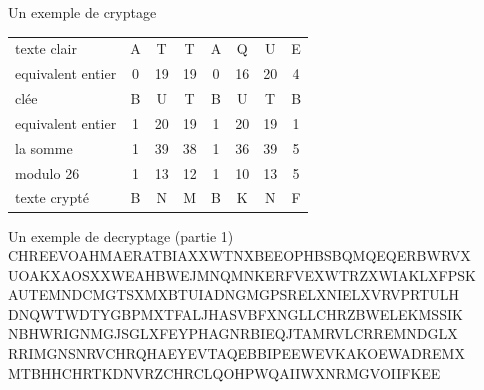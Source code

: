 \documentclass[10pt,xcolor=table]{beamer}
\begin{document}
\begin{frame}
\begin{exampleblock}{Un exemple de cryptage} %
\begin{tabular}{l!{\vrule}ccccccc} 
texte clair & A & T & T & A & Q & U & E \pause \\  
equivalent entier & 0 & 19 & 19 & 0 & 16 & 20 & 4 \pause \\ 
clée & B & U & T & B & U & T & B \pause  \\ 
equivalent entier & 1 & 20 & 19 & 1 & 20 & 19 & 1\pause \\ \hline
la somme & 1 & 39 & 38 & 1 & 36 & 39 & 5\pause \\ \hline
modulo 26 & 1 & 13 & 12 & 1 & 10 & 13 & 5 \pause \\ \hline
texte crypté & B & N & M & B & K & N & F \pause \\
\end{tabular}
\end{exampleblock}
\begin{exampleblock}{Un exemple de decryptage (partie 1)} %
 CHREEVOAHMAERATBIAXXWTNXBEEOPHBSBQMQEQERBWRVX
 UOAKXAOSXXWEAHBWEJMNQMNKERFVEXWTRZXWIAKLXFPSK
 AUTEMNDCMGTSXMXBTUIADNGMGPSRELXNIELXVRVPRTULH
 DNQWTWDTYGBPMXTFALJHASVBFXNGLLCHRZBWELEKMSSIK
 NBHWRIGNMGJSGLXFEYPHAGNRBIEQJTAMRVLCRREMNDGLX
 RRIMGNSNRVCHRQHAEYEVTAQEBBIPEEWEVKAKOEWADREMX
 MTBHHCHRTKDNVRZCHRCLQOHPWQAIIWXNRMGVOIIFKEE
\end{exampleblock}
\end{frame}
\end{document}
